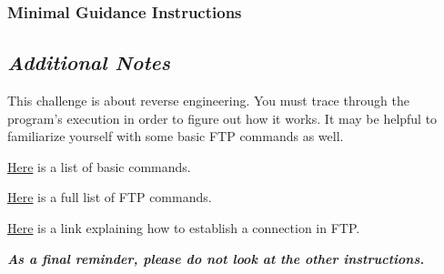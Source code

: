         \subsubsection{Minimal Guidance Instructions}
            {\parindent0pt\singlespacing
                \subsection*{\textit{Additional Notes}}
                    This challenge is about reverse engineering. You must trace through the program's execution in order to figure out how it works. It may be helpful to familiarize yourself with some basic FTP commands as well. 

                    \href{https://kb.iu.edu/d/aenq}{Here} is a list of basic commands.

                    \href{https://en.wikipedia.org/wiki/List_of_FTP_commands}{Here} is a full list of FTP commands.

                    \href{https://www.serv-u.com/resource/tutorial/pasv-response-epsv-port-pbsz-rein-ftp-command#fac52a38-7ddb-4815-a9dc-72cc03c0a8e6}{Here} is a link explaining how to establish a connection in FTP.

                    \textbf{\textit{As a final reminder, please do not look at the other instructions.}}
            }
        \newpage
